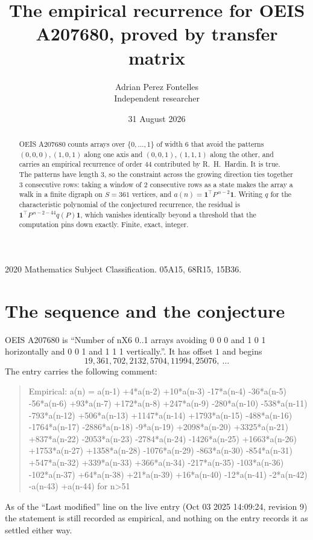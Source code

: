\documentclass[11pt,a4paper]{article}
\title{The empirical recurrence for OEIS A207680, proved by transfer matrix}
\author{Adrian Perez Fontelles\\ \small Independent researcher}
\date{31 August 2026}
\theoremstyle{plain}
\theoremstyle{definition}
\begin{document}
\maketitle

\begin{abstract}
OEIS A207680 counts arrays over $\{0,\dots,1\}$ of width $6$ that avoid the patterns
$(0,0,0), (1,0,1)$ along one axis and $(0,0,1), (1,1,1)$ along the other, and carries an empirical recurrence of
order $44$ contributed by R.~H.~Hardin. It is true. The patterns have length $3$, so
the constraint across the growing direction ties together $3$ consecutive rows: taking a
window of $2$ consecutive rows as a state makes the array a walk in a finite digraph
on $S=361$ vertices, and $a(n)=\mathbf{1}^{\!\top}P^{\,n-2}\mathbf{1}$. Writing $q$
for the characteristic polynomial of the conjectured recurrence, the residual is
$\mathbf{1}^{\!\top}P^{\,n-2-44}q(P)\mathbf{1}$, which vanishes identically
beyond a threshold that the computation pins down exactly. Finite, exact, integer.
\end{abstract}

\noindent\small 2020 Mathematics Subject Classification. 05A15, 68R15, 15B36.\normalsize

\section{The sequence and the conjecture}

OEIS A207680 is ``Number of nX6 0..1 arrays avoiding 0 0 0 and 1 0 1 horizontally and 0 0 1 and 1 1 1 vertically.''. It has offset
$1$ and begins
\[
19, 361, 702, 2132, 5704, 11994, 25076,\ \dots
\]
The entry carries the following comment:
\begin{quote}\small
Empirical: a(n) = a(n-1) +4*a(n-2) +10*a(n-3) -17*a(n-4) -36*a(n-5) -56*a(n-6) +93*a(n-7) +172*a(n-8) +247*a(n-9) -280*a(n-10) -538*a(n-11) -793*a(n-12) +506*a(n-13) +1147*a(n-14) +1793*a(n-15) -488*a(n-16) -1764*a(n-17) -2886*a(n-18) -9*a(n-19) +2098*a(n-20) +3325*a(n-21) +837*a(n-22) -2053*a(n-23) -2784*a(n-24) -1426*a(n-25) +1663*a(n-26) +1753*a(n-27) +1358*a(n-28) -1076*a(n-29) -863*a(n-30) -854*a(n-31) +547*a(n-32) +339*a(n-33) +366*a(n-34) -217*a(n-35) -103*a(n-36) -102*a(n-37) +64*a(n-38) +21*a(n-39) +16*a(n-40) -12*a(n-41) -2*a(n-42) -a(n-43) +a(n-44) for n>51
\end{quote}
As of the ``Last modified'' line on the live entry (Oct 03 2025 14:09:24, revision
9) the statement is still recorded as empirical, and nothing on the entry
records it as settled either way.
\end{document}
